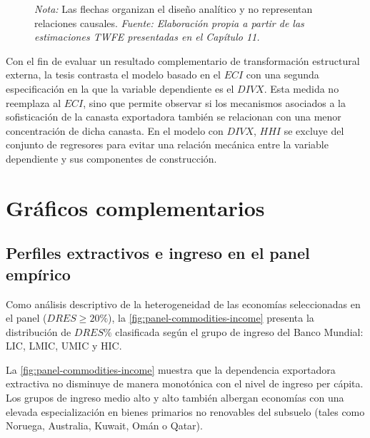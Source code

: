 \documentclass[../../TFM.tex]{subfiles}
\begin{document}
\begin{figure}[htbp]
{%
		}

		\caption[Diseño empírico y asociaciones principales]{Diseño empírico y asociaciones principales entre la selección mediante $DRES$, $RENTS$, los canales considerados y los resultados en $ECI$ y $DIVX$.}

		\label{fig:arquitectura-mecanismos}
		\caption*{\footnotesize \textit{Nota:} Las flechas organizan el diseño analítico y no representan relaciones causales. \textit{Fuente: Elaboración propia a partir de las estimaciones TWFE presentadas en el Capítulo 11.}}
	\end{figure}

	Con el fin de evaluar un resultado complementario de transformación estructural externa, la tesis contrasta el modelo basado en el $ECI$ con una segunda especificación en la que la variable dependiente es el $DIVX$. Esta medida no reemplaza al $ECI$, sino que permite observar si los mecanismos asociados a la sofisticación de la canasta exportadora también se relacionan con una menor concentración de dicha canasta. En el modelo con $DIVX$, $HHI$ se excluye del conjunto de regresores para evitar una relación mecánica entre la variable dependiente y sus componentes de construcción.



	\section{Gráficos complementarios}
	\label{sec:plots}

	\subsection{Perfiles extractivos e ingreso en el panel empírico}
	\label{sec:figuras-panel-ingreso}

	Como análisis descriptivo de la heterogeneidad de las economías seleccionadas en el panel ($DRES \ge 20\%$), la \autoref{fig:panel-commodities-income} presenta la distribución de $DRES\%$ clasificada según el grupo de ingreso del Banco Mundial: LIC, LMIC, UMIC y HIC.

	La \autoref{fig:panel-commodities-income} muestra que la dependencia exportadora extractiva no disminuye de manera monotónica con el nivel de ingreso per cápita. Los grupos de ingreso medio alto y alto también albergan economías con una elevada especialización en bienes primarios no renovables del subsuelo (tales como Noruega, Australia, Kuwait, Omán o Qatar).
\end{document}
